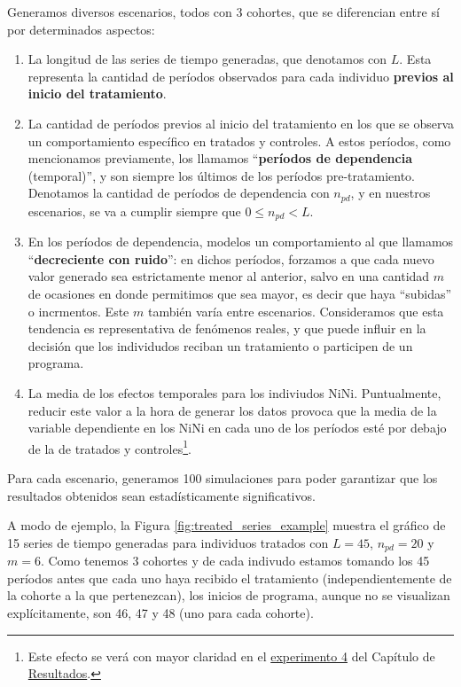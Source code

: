 \documentclass[../../main.tex]{subfiles}
\begin{document}
Generamos diversos escenarios, todos con 3 cohortes, que se diferencian entre sí por
determinados aspectos:
\begin{enumerate}[itemsep=0.05cm, label=\textbf{\arabic*.}]
    \item La longitud de las series de tiempo generadas, que denotamos con \(L\). Esta
    representa la cantidad de períodos observados para cada individuo \textbf{previos al inicio
    del tratamiento}.
    \item La cantidad de períodos previos al inicio del tratamiento en los que se observa
    un comportamiento específico en tratados y controles. A estos períodos, como
    mencionamos previamente, los llamamos ``\textbf{períodos de dependencia} (temporal)'',
    y son siempre los últimos de los períodos pre-tratamiento. Denotamos la cantidad de
    períodos de dependencia con \(n_{pd}\), y en nuestros escenarios, se va a cumplir
    siempre que \(0 \le n_{pd} < L\).
    \item En los períodos de dependencia, modelos un comportamiento al que llamamos
    ``\textbf{decreciente con ruido}'': en dichos períodos, forzamos a que cada nuevo
    valor generado sea estrictamente menor al anterior, salvo en una cantidad \(m\) de
    ocasiones en donde permitimos que sea mayor, es decir que haya ``subidas'' o
    incrmentos. Este \(m\) también varía entre escenarios. Consideramos que esta tendencia
    es representativa de fenómenos reales, y que puede influir en la decisión que los
    individudos reciban un tratamiento o participen de un programa.
    \item La media de los efectos temporales para los indiviudos NiNi. Puntualmente,
    reducir este valor a la hora de generar los datos provoca que la media de la variable
    dependiente en los NiNi en cada uno de los períodos esté por debajo de la de tratados
    y controles\footnote{Este efecto se verá con mayor claridad en el
    \hyperref[sec:exp4]{experimento 4} del Capítulo de
    \hyperref[chap:resultados]{Resultados}.}.
\end{enumerate}
Para cada escenario, generamos 100 simulaciones para poder garantizar que los resultados
obtenidos sean estadísticamente significativos.

A modo de ejemplo, la Figura \ref{fig:treated_series_example} muestra el gráfico de 15
series de tiempo generadas para individuos tratados con \(L=45\), \(n_{pd}=20\) y \(m=6\).
Como tenemos 3 cohortes y de cada indivudo estamos tomando los 45 períodos antes que cada
uno haya recibido el tratamiento (independientemente de la cohorte a la que pertenezcan),
los inicios de programa, aunque no se visualizan explícitamente, son 46, 47 y 48 (uno para
cada cohorte).
\end{document}
